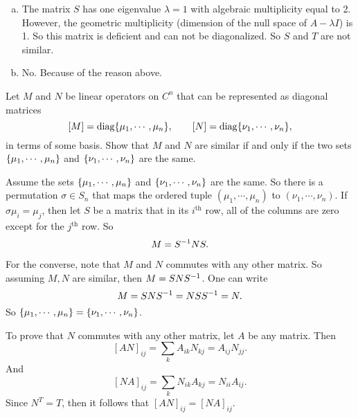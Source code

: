 \begin{solution}
	
	\begin{enumerate}[(a)]
		\item The matrix $ S $ has one eigenvalue $ \lambda = 1 $ with algebraic multiplicity equal to 2. However, the geometric multiplicity (dimension of the null space of $ A-\lambda I $) is 1. So this matrix is deficient and can not be diagonalized. So $ S $ and $ T $ are not similar.
		
		\item No. Because of the reason above.
	\end{enumerate}
	
\end{solution}


\begin{problem}
	Let $ M $ and $ N $ be linear operators on $ C^n $ that can be represented as diagonal matrices
	\[ [M] = \operatorname{diag}\{\mu_1,\cdots,\mu_n\},\qquad [N] = \operatorname{diag}\{\nu_1,\cdots,\nu_n\}, \]
	in terms of some basis. Show that $ M $ and $ N $ are similar if and only if the two sets $ \{\mu_1,\cdots,\mu_n\} $ and $ \{\nu_1,\cdots,\nu_n\} $ are the same.
\end{problem}
\begin{solution}
	Assume  the sets $ \{\mu_1,\cdots,\mu_n\} $ and $ \{\nu_1,\cdots,\nu_n\} $ are the same. So there is a permutation $ \sigma \in S_n $ that maps the ordered tuple $ (\mu_1,\cdots,\mu_n) $ to $ (\nu_1,\cdots,\nu_n) $. If $ \sigma \mu_i = \mu_j $, then let $ S $ be a matrix that in its $ i^\text{th} $ row, all of the columns are zero except for the $ j^\text{th} $ row. So
	\[ M = S^{-1} N S. \]
	
	For the converse, note that $ M $ and $ N $ commutes with any other matrix. So assuming $ M,N $ are similar, then $ M = S N S^{-1} $. One can write
	\[ M = SNS^{-1} = NSS^{-1} = N. \]
	So $ \{\mu_1,\cdots,\mu_n\} = \{\nu_1,\cdots,\nu_n\} $.
\end{solution}
\begin{remark}
	To prove that $ N $ commutes with any other matrix, let $ A $ be any matrix. Then
	\[ [AN]_{ij} = \sum_k A_{ik}N_{kj} = A_{ij}N_{jj}. \]
	And
	\[ [NA]_{ij} = \sum_k N_{ik}A_{kj} = N_{ii}A_{ij}. \]
	Since $ N^T = T $, then it follows that $ [AN]_{ij} = [NA]_{ij} $.
\end{remark}


